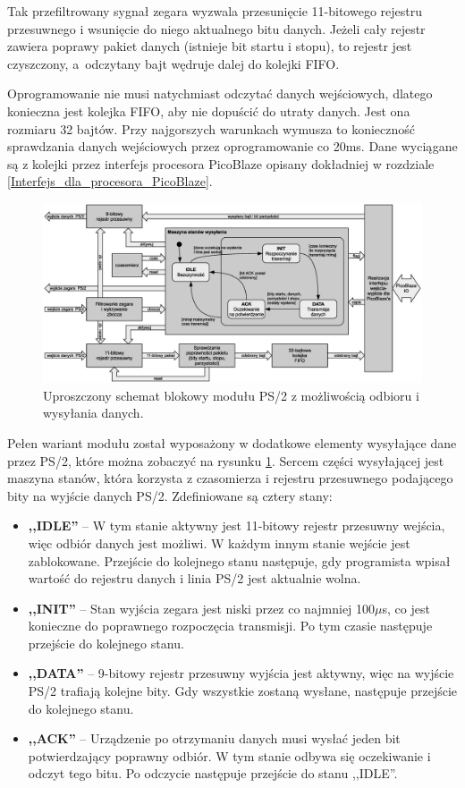 Tak przefiltrowany sygnał zegara wyzwala przesunięcie 11-bitowego rejestru przesuwnego i wsunięcie do niego aktualnego bitu danych. Jeżeli cały rejestr zawiera poprawy pakiet danych (istnieje bit startu i stopu), to rejestr jest czyszczony, a~odczytany bajt wędruje dalej do kolejki FIFO.

Oprogramowanie nie musi natychmiast odczytać danych wejściowych, dlatego konieczna jest kolejka FIFO, aby nie dopuścić do utraty danych. Jest ona rozmiaru 32 bajtów. Przy najgorszych warunkach wymusza to konieczność sprawdzania danych wejściowych przez oprogramowanie co 20ms. Dane wyciągane są z kolejki przez interfejs procesora PicoBlaze opisany dokładniej w rozdziale \ref{Interfejs_dla_procesora_PicoBlaze}.


\begin{figure}
	\centering
	\includegraphics[width=22cm]{obrazki/ps2inputOutput.eps}
	\caption{Uproszczony schemat blokowy modułu PS/2 z możliwością odbioru i wysyłania danych.}
	\label{ps2inputOutput}
\end{figure}


Pełen wariant modułu został wyposażony w dodatkowe elementy wysyłające dane przez PS/2, które można zobaczyć na rysunku \ref{ps2inputOutput}. Sercem części wysyłającej jest maszyna stanów, która korzysta z czasomierza i rejestru przesuwnego podającego bity na wyjście danych PS/2. Zdefiniowane są cztery stany:
\begin{itemize}
	\item \textbf{,,IDLE''} -- W tym stanie aktywny jest 11-bitowy rejestr przesuwny wejścia, więc odbiór danych jest możliwi. W każdym innym stanie wejście jest zablokowane. Przejście do kolejnego stanu następuje, gdy programista wpisał wartość do rejestru danych i linia PS/2 jest aktualnie wolna.
	\item \textbf{,,INIT''} -- Stan wyjścia zegara jest niski przez co najmniej 100$\mu$s, co jest konieczne do poprawnego rozpoczęcia transmisji. Po tym czasie następuje przejście do kolejnego stanu.
	\item \textbf{,,DATA''} -- 9-bitowy rejestr przesuwny wyjścia jest aktywny, więc na wyjście PS/2 trafiają kolejne bity. Gdy wszystkie zostaną wysłane, następuje przejście do kolejnego stanu.
	\item \textbf{,,ACK''} -- Urządzenie po otrzymaniu danych musi wysłać jeden bit potwierdzający poprawny odbiór. W tym stanie odbywa się oczekiwanie i odczyt tego bitu. Po odczycie następuje przejście do stanu ,,IDLE''.
\end{itemize}

